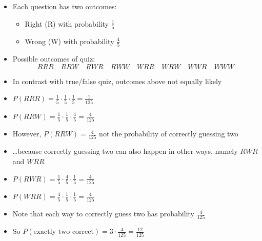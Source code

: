 \documentclass[xcolor=dvipsnames]{beamer}
\theoremstyle{definition}
\begin{document}
\begin{frame}
\begin{itemize}
\item Each question has two outcomes:
\begin{itemize}
\item Right (R) with probability $\frac{1}{5}$
\item Wrong (W) with probability $\frac{4}{5}$
\end{itemize}
\item Possible outcomes of quiz:
\[RRR\quad RRW\quad RWR\quad RWW\quad WRR\quad WRW\quad WWR\quad WWW\]
\item In contrast with true/false quiz, outcomes above not equally likely
\item $P\left(RRR\right)=\frac{1}{5}\cdot\frac{1}{5}\cdot\frac{1}{5}
=\frac{1}{125}$
\item $P\left(RRW\right)=\frac{1}{5}\cdot\frac{1}{5}\cdot\frac{4}{5}
=\frac{4}{125}$
\end{itemize}
\end{frame}

\begin{frame}
\begin{itemize}
\item However, $P\left(RRW\right)=\frac{4}{125}$
\alert{not} the probability of correctly guessing two
\item \dots because correctly guessing two can also happen
in other ways, namely $RWR$ and $WRR$
\item $P\left(RWR\right)=\frac{1}{5}\cdot\frac{4}{5}\cdot\frac{1}{5}
=\frac{4}{125}$
\item $P\left(WRR\right)=\frac{4}{5}\cdot\frac{1}{5}\cdot\frac{1}{5}
=\frac{4}{125}$
\item Note that each way to correctly guess two has probability
$\frac{4}{125}$
\item So $P\left(\text{exactly two correct}\right)=3\cdot\frac{4}{125}
=\frac{12}{125}$
\end{itemize}
\end{frame}
\end{document}
